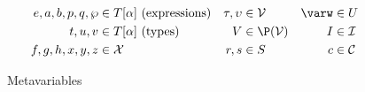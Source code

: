 \begin{figure}
\centering
\begin{align*}
e, a, b, p, q, \wp  &\in T[\alpha]    ~ \text{(expressions)}  & \tau, \upsilon  &\in \mathcal{V}      & \varw &\in U \\
t, u, v             &\in T[\alpha]    ~ \text{(types)}        & V               &\in \P(\mathcal{V})  & I     &\in \mathcal{I}\\
f, g, h, x, y, z    &\in \mathcal{X}                          & r, s            &\in S                & c     &\in \mathcal{C}
\end{align*}
\caption{Metavariables}
\label{fig:metavariables}
\end{figure}

